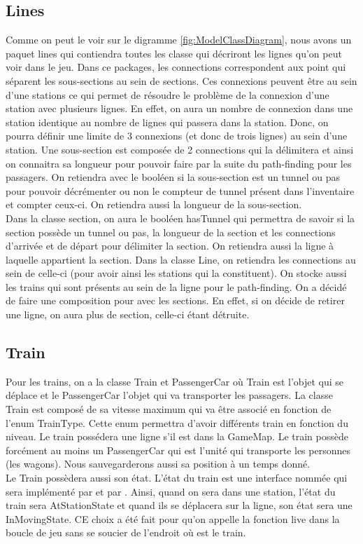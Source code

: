 \documentclass[report, backcover, french, nodocumentinfo]{upmethodology-document}
\begin{document}
			\subsection{Lines}
					Comme on peut le voir sur le digramme \ref{fig:ModelClassDiagram}, nous avons un paquet lines qui contiendra toutes les classe qui décriront les lignes qu'on peut voir dans le jeu. Dans ce packages, les connections correspondent aux point qui séparent les sous-sections au sein de sections. Ces connexions peuvent être au sein d'une stations ce qui permet de résoudre le problème de la connexion d'une station avec plusieurs lignes. En effet, on aura un nombre de connexion dans une station identique au nombre de lignes qui passera dans la station. Donc, on pourra définir une limite de 3 connexions (et donc de trois lignes) au sein d'une station.
					Une sous-section est composée de 2 connections qui la délimitera et ainsi on connaitra sa longueur pour pouvoir faire par la suite du path-finding pour les passagers. On retiendra avec le booléen si la sous-section est un tunnel ou pas pour pouvoir décrémenter ou non le compteur de tunnel présent dans l'inventaire et compter ceux-ci. On retiendra aussi la longueur de la sous-section.\\
					Dans la classe section, on aura le booléen hasTunnel qui permettra de savoir si la section possède un tunnel ou pas, la longueur de la section et les connections d'arrivée et de départ pour délimiter la section. On retiendra aussi la ligne à laquelle appartient la section.
					Dans la classe Line, on retiendra les connections au sein de celle-ci (pour avoir ainsi les stations qui la constituent). On stocke aussi les trains qui sont présents au sein de la ligne pour le path-finding. On a décidé de faire une composition pour avec les sections. En effet, si on décide de retirer une ligne, on aura plus de section, celle-ci étant détruite.
			\subsection{Train}
				Pour les trains, on a la classe Train et PassengerCar où Train est l'objet qui se déplace et le PassengerCar l'objet qui va transporter les passagers. La classe Train est composé de sa vitesse maximum qui va être associé en fonction de l'enum TrainType. Cette enum permettra d'avoir différents train en fonction du niveau. Le train possédera une ligne s'il est dans la GameMap. Le train possède forcément au moins un PassengerCar qui est l'unité qui transporte les personnes (les wagons). Nous sauvegarderons aussi sa position à un temps donné.
				\\Le Train possèdera aussi son état. L'état du train est une interface nommée  qui sera implémenté par  et par . Ainsi, quand on sera dans une station, l'état du train sera AtStationState et quand ils se déplacera sur la ligne, son état sera une InMovingState. CE choix a été fait pour qu'on appelle la fonction live dans la boucle de jeu sans se soucier de l'endroit où est le train.
\end{document}

